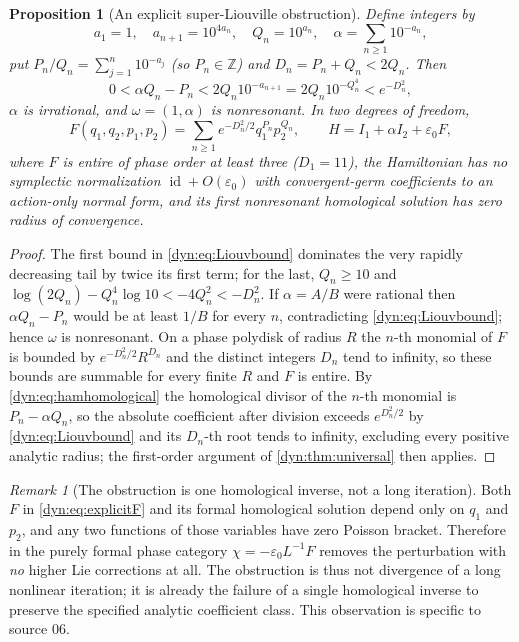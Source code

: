 \documentclass[11pt,letterpaper]{article}
\newtheorem{proposition}[proposition]{Proposition}
\theoremstyle{definition}
\theoremstyle{remark}
\newtheorem{remark}[remark]{Remark}
\newcommand{\Z}{\mathbb Z}
\newcommand{\id}{\operatorname{id}}
\newcommand{\eps}{\varepsilon}
\numberwithin{equation}{section}
\begin{document}
\begin{proposition}[An explicit super-Liouville obstruction]
\label{dyn:prop:explicitbad}
Define integers by
\begin{equation}\label{dyn:eq:Liouv}
 a_1=1,\quad a_{n+1}=10^{4a_n},\quad Q_n=10^{a_n},\quad
 \alpha=\sum_{n\ge1}10^{-a_n},
\end{equation}
put $P_n/Q_n=\sum_{j=1}^{n}10^{-a_j}$ (so $P_n\in\Z$) and
$D_n=P_n+Q_n<2Q_n$. Then
\begin{equation}\label{dyn:eq:Liouvbound}
 0<\alpha Q_n-P_n<2Q_n10^{-a_{n+1}}=2Q_n10^{-Q_n^{4}}<e^{-D_n^{2}},
\end{equation}
$\alpha$ is irrational, and $\omega=(1,\alpha)$ is nonresonant. In two
degrees of freedom,
\begin{equation}\label{dyn:eq:explicitF}
 F(q_1,q_2,p_1,p_2)=\sum_{n\ge1}e^{-D_n^{2}/2}q_1^{P_n}p_2^{Q_n},
 \qquad H=I_1+\alpha I_2+\eps_0F,
\end{equation}
where $F$ is entire of phase order at least three ($D_1=11$), the
Hamiltonian has \emph{no} symplectic normalization $\id+O(\eps_0)$ with
convergent-germ coefficients to an action-only normal form, and its first
nonresonant homological solution has zero radius of convergence.
\end{proposition}
\begin{proof}
The first bound in \eqref{dyn:eq:Liouvbound} dominates the very rapidly
decreasing tail by twice its first term; for the last, $Q_n\ge10$ and
$\log(2Q_n)-Q_n^{4}\log10<-4Q_n^{2}<-D_n^{2}$. If $\alpha=A/B$ were
rational then $\alpha Q_n-P_n$ would be at least $1/B$ for every $n$,
contradicting \eqref{dyn:eq:Liouvbound}; hence $\omega$ is nonresonant. On
a phase polydisk of radius $R$ the $n$-th monomial of $F$ is bounded by
$e^{-D_n^{2}/2}R^{D_n}$ and the distinct integers $D_n$ tend to infinity,
so these bounds are summable for every finite $R$ and $F$ is entire. By
\eqref{dyn:eq:hamhomological} the homological divisor of the $n$-th
monomial is $P_n-\alpha Q_n$, so the absolute coefficient after division
exceeds $e^{D_n^{2}/2}$ by \eqref{dyn:eq:Liouvbound} and its $D_n$-th root
tends to infinity, excluding every positive analytic radius; the
first-order argument of \cref{dyn:thm:universal} then applies.
\end{proof}

\begin{remark}[The obstruction is one homological inverse, not a long
iteration]\label{dyn:rem:oneinverse}
Both $F$ in \eqref{dyn:eq:explicitF} and its formal homological solution
depend only on $q_1$ and $p_2$, and any two functions of those variables
have zero Poisson bracket. Therefore in the purely formal phase category
$\chi=-\eps_0L^{-1}F$ removes the perturbation with \emph{no} higher Lie
corrections at all. The obstruction is thus not divergence of a long
nonlinear iteration; it is already the failure of a single homological
inverse to preserve the specified analytic coefficient class. This
observation is specific to source 06.
\end{remark}
\end{document}
